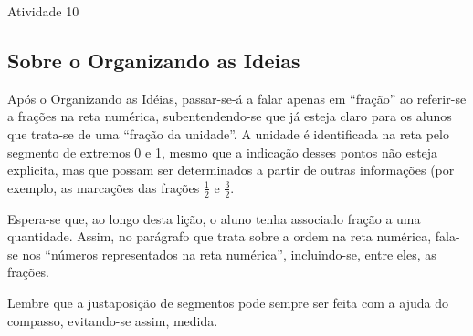 \begin{multicols}{2}
\begin{resposta*}{Atividade 10}

\end{resposta*}

\subsection{Sobre o Organizando as Ideias}



Após o Organizando as Idéias, passar-se-á a falar apenas em ``fração'' ao referir-se a frações na reta numérica, subentendendo-se que já esteja claro para os alunos que trata-se de uma ``fração da unidade''. A unidade é identificada na reta pelo segmento de extremos 0 e 1, mesmo que a indicação desses pontos não esteja explicita, mas que possam ser determinados a partir de outras informações (por exemplo, as marcações das frações  $\frac{1}{2}$       e       $\frac{3}{2}$.

Espera-se que, ao longo desta lição, o aluno tenha associado fração a uma quantidade. Assim, no parágrafo que trata sobre a ordem na reta numérica, fala-se nos ``números representados na reta numérica'', incluindo-se, entre eles, as frações.

Lembre que a justaposição de segmentos pode sempre ser feita com a ajuda do compasso, evitando-se assim, medida.

\Bg
\Bg



\end{multicols}
